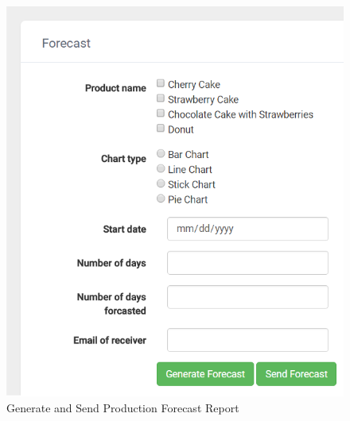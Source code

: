 \documentclass[a4paper,11pt,twoside]{report}
\theoremstyle{definition}
\begin{document}
\begin{enumerate}
\begin{enumerate}
\begin{figure}[h!]
\begin{center}
\includegraphics[width=\textwidth]{AS/report/2}
\end{center}
\caption{Generate and Send Production Forecast Report}
\end{figure}
\thispagestyle{empty}


\end{enumerate}
\end{enumerate}
\end{document}
